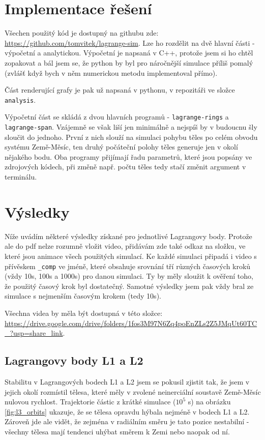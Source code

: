 \documentclass[a4paper,11pt]{article}
\begin{document}
\section{Implementace řešení}

Všechen použitý kód je dostupný na githubu zde: \url{https://github.com/tomvitek/lagrange-sim}.
Lze ho rozdělit na dvě hlavní části - výpočetní a analytickou. Výpočetní je napsaná v C++, protože
jsem si ho chtěl zopakovat a bál jsem se, že python by byl pro náročnější simulace příliš pomalý
(zvlášť když bych v něm numerickou metodu implementoval přímo).

Část renderující grafy je pak už napsaná v pythonu, v repozitáři ve složce \texttt{analysis}.

Výpočetní část se skládá z dvou hlavních programů - \texttt{lagrange-rings} a \texttt{lagrange-span}.
Vzájemně se však liší jen minimálně a nejspíš by v budoucnu šly sloučit do jednoho. První z nich slouží
na simulaci pohybu těles po celém obvodu systému Země-Měsíc, ten druhý počáteční polohy těles generuje jen v okolí nějakého bodu.
Oba programy přijímají řadu parametrů, které jsou popsány ve zdrojových kódech, při změně např. počtu těles tedy stačí
změnit argument v terminálu.

\section{Výsledky}

Níže uvádím některé výsledky získané pro jednotlivé Lagrangovy body.
Protože ale do pdf nelze rozumně vložit video, přidávám zde také odkaz
na složku, ve které jsou animace všech použitých simulací. Ke každé simulaci
připadá i video s přívěskem \texttt{\_comp} ve jméně, které obsahuje srovnání
tří různých časových kroků (vždy 10s, 100s a 1000s) pro danou simulaci.
Ty by měly sloužit k ověření toho, že použitý časový krok byl dostatečný.
Samotné výsledky jsem pak vždy bral ze simulace s nejmenším časovým krokem (tedy 10s).

Všechna videa by měla být dostupná v této složce: \url{https://drive.google.com/drive/folders/1fos3M97N6Zq4poEnZLs2Z5JMqUt60TC_?usp=share_link}.

\subsection{Lagrangovy body L1 a L2}

Stabilitu v Lagrangových bodech L1 a L2 jsem se pokusil zjistit tak, že jsem v jejich okolí rozmístil tělesa, které měly 
v zvolené neinerciální soustavě Země-Měsíc nulovou rychlost. Trajektorie částic z krátké simulace ($10^5$ s) na 
obrázku \ref{fig:l3_orbits} ukazuje, 
že se tělesa opravdu hýbala nejméně v bodech L1 a L2. Zároveň jde ale vidět, že zejména v radiálním směru je tato pozice nestabilní -
všechny tělesa mají tendenci uhýbat směrem k Zemi nebo naopak od ní.
\end{document}

